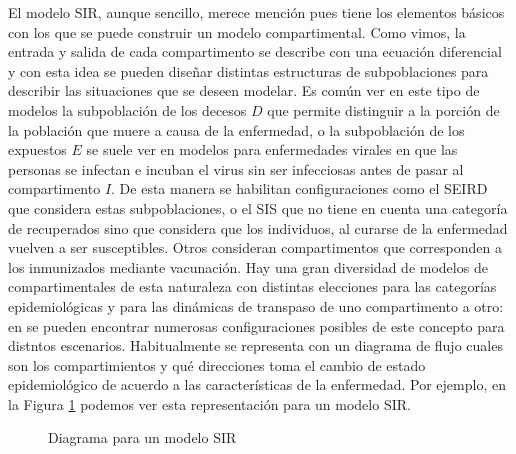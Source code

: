 El modelo SIR, aunque sencillo, merece mención pues tiene los elementos básicos con los que se puede construir un modelo compartimental. Como vimos, la entrada y salida de cada compartimento se describe con una ecuación diferencial y con esta idea se pueden diseñar distintas estructuras de subpoblaciones para describir las situaciones que se deseen modelar. Es común ver en este tipo de modelos la subpoblación de los decesos $D$ que permite distinguir a la porción de la población que muere a causa de la enfermedad, o la subpoblación de los expuestos $E$ se suele ver en modelos para enfermedades virales en que las personas se infectan e incuban el virus sin ser infecciosas antes de pasar al compartimento $I$. De esta manera se habilitan configuraciones como el SEIRD que considera estas subpoblaciones, o el SIS que no tiene en cuenta una categoría de recuperados sino que considera que los individuos, al curarse de la enfermedad vuelven a ser susceptibles. Otros consideran compartimentos que corresponden a los inmunizados mediante vacunación. Hay una gran diversidad de modelos de compartimentales de esta naturaleza con distintas elecciones para las categorías epidemiológicas y para las dinámicas de transpaso de uno compartimento a otro: en \citep{Murray2007} se pueden encontrar numerosas configuraciones posibles de este concepto para distntos escenarios. Habitualmente se representa con un diagrama de flujo cuales son los compartimientos y qué direcciones toma el cambio de estado epidemiológico de acuerdo a las características de la enfermedad. Por ejemplo, en la Figura \ref{dia:sir} podemos ver esta representación para un modelo SIR.
\begin{figure}[h]
    \centering
    \caption{Diagrama para un modelo SIR} \label{dia:sir}
\end{figure}

